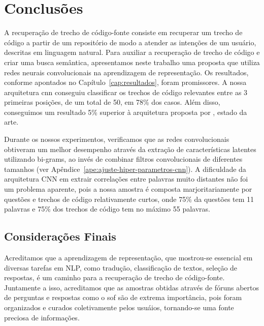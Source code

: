 \chapter{Conclusões}
\label{cap:conclusoes}


A recuperação de trecho de código-fonte consiste em recuperar um trecho de código a partir de um repositório de modo a atender as intenções de um usuário, descritas em linguagem natural. Para auxiliar a recuperação de trecho de código e criar uma busca semântica, apresentamos neste trabalho uma proposta que utiliza redes neurais convolucionais na aprendizagem de representação. Os resultados, conforme apontados no Capítulo~\ref{cap:resultados}, foram promissores. A nossa arquitetura \acrshort{cnn} conseguiu classificar os trechos de código relevantes entre as 3 primeiras posições, de um total de 50, em 78\% dos casos. Além disso, conseguimos um resultado 5\% superior à arquitetura proposta por \cite{cambronero-deep-learning-code-search:2019}, estado da arte.

Durante os nossos experimentos, verificamos que as redes convolucionais obtiveram um melhor desempenho através da extração de características latentes utilizando bi-grams, ao invés de combinar filtros convolucionais de diferentes tamanhos (ver Apêndice~\ref{ape:ajuste-hiper-parametros-cnn}). A dificuldade da arquitetura CNN em extrair correlações entre palavras muito distantes não foi um problema aparente, pois a nossa amostra é composta marjoritariamente por questões e trechos de código relativamente curtos, onde 75\% da questões tem 11 palavras e 75\% dos trechos de código tem no máximo 55 palavras. 


\section{Considerações Finais} 
\label{sec:consideracoes-finais}

Acreditamos que a aprendizagem de representação, que mostrou-se essencial em diversas tarefas em NLP, como tradução, classificação de textos, seleção de respostas, é um caminho para a recuperação de trecho de código-fonte. Juntamente a isso, acreditamos que as amostras obtidas através de fóruns abertos de perguntas e respostas como o \Gls{sof} são de extrema importância, pois foram organizados e curados coletivamente pelos usuáios, tornando-se uma fonte preciosa de informações.

